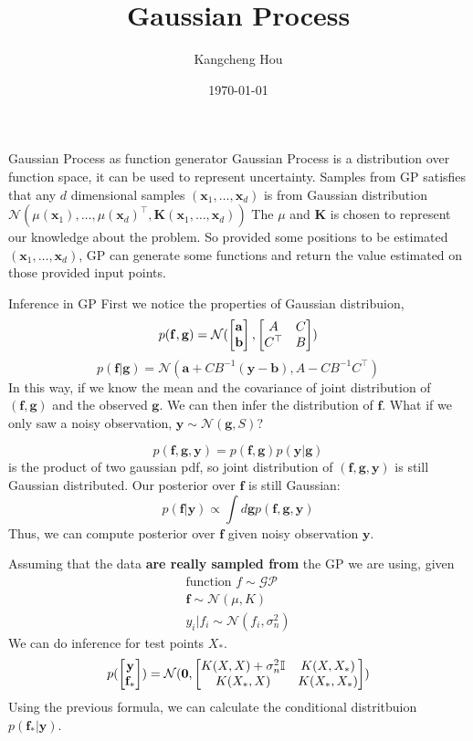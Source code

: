 \documentclass{beamer}
\title{Gaussian Process}
\author{Kangcheng Hou}
\institute{Zhejiang University}
\date{\today}
\begin{document}
    
\frame{\titlepage}

\begin{frame}{Gaussian Process as function generator}
Gaussian Process is a distribution over function space, it can be used to represent uncertainty.
Samples from GP satisfies that any $d$ dimensional samples $(\mathbf{x}_1, \dots, \mathbf{x}_d)$ is from Gaussian distribution $\mathcal{N}(\mu(\mathbf{x}_1), \dots, \mu(\mathbf{x}_d)^\top, \mathbf{K}(\mathbf{x}_1, \dots, \mathbf{x}_d))$ 
The $\mu$ and $\mathbf{K}$ is chosen to represent our knowledge about the problem.
So provided some positions to be estimated $(\mathbf{x}_1, \dots, \mathbf{x}_d)$, GP can generate some functions and return the value estimated on those provided input points.
\end{frame}

\begin{frame}[allowframebreaks]{Inference in GP}
First we notice the properties of Gaussian distribuion,
$$p(\mathbf{f}, \mathbf{g}) = \mathcal{N}(\begin{bmatrix}\mathbf{a}\\\mathbf{b}\end{bmatrix}, \begin{bmatrix}A & C \\ C^\top &  B\end{bmatrix})$$
$$p(\mathbf{f} | \mathbf{g}) = \mathcal{N}(\mathbf{a} + CB^{-1}(\mathbf{y} - \mathbf{b}), A - C B^{-1} C^\top)$$
In this way, if we know the mean and the covariance of joint distribution of $(\mathbf{f}, \mathbf{g})$ and the observed $\mathbf{g}$. We can then infer the distribution of $\mathbf{f}$. 
What if we only saw a noisy observation, $\mathbf{y} \sim \mathcal{N}(\mathbf{g}, S)$?

\framebreak
$$p(\mathbf{f}, \mathbf{g}, \mathbf{y}) = p(\mathbf{f}, \mathbf{g}) p(\mathbf{y} | \mathbf{g})$$
is the product of two gaussian pdf, so joint distribution of $(\mathbf{f}, \mathbf{g}, \mathbf{y})$ is still Gaussian distributed.
Our posterior over $\mathbf{f}$ is still Gaussian:
$$p(\mathbf{f} | \mathbf{y}) \propto \int d \mathbf{g} p(\mathbf{f}, \mathbf{g}, \mathbf{y})$$
Thus, we can compute posterior over $\mathbf{f}$ given noisy observation $\mathbf{y}$.

\framebreak

Assuming that the data \textbf{are really sampled from } the GP we are using, given
\begin{align*}
\text{function }f \sim \mathcal{GP} \\ 
\mathbf{f} \sim \mathcal{N}(\mu, K) \\
y_i | f_i \sim \mathcal{N}(f_i, \sigma_n^2)
\end{align*}
We can do inference for test points $X_\ast$.
$$p(\begin{bmatrix}\mathbf{y} \\ \mathbf{f}_\ast\end{bmatrix}) = \mathcal{N}(\mathbf{0}, \begin{bmatrix}K(X, X) + \sigma_n^2 \mathbb{I} & K(X, X_\ast) \\ K(X_\ast, X) & K(X_\ast, X_\ast)\end{bmatrix})$$
Using the previous formula, we can calculate the conditional distritbuion $p(\mathbf{f}_\ast | \mathbf{y})$.
\end{frame}
\end{document}

